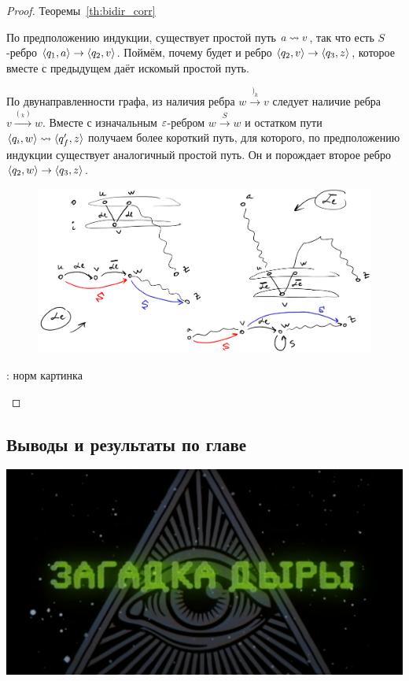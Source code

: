 \begin{proof}{Теоремы~\ref{th:bidir_corr}}
\begin{itemize}
      По предположению индукции, существует простой путь $a \rightsquigarrow v$, так что есть $S$-ребро $\langle q_1, a \rangle \rightarrow \langle q_2, v \rangle$. Поймём, почему будет и ребро $\langle q_2, v \rangle \rightarrow \langle q_3, z \rangle$, которое вместе с предыдущем даёт искомый простой путь.

      По двунаправленности графа, из наличия ребра $w \xrightarrow{)_k} v$ следует наличие ребра $v \xrightarrow{(_k)} w$. Вместе с изначальным $\varepsilon$-ребром $w \xrightarrow{S} w$ и остатком пути $\langle q_i, w \rangle \rightsquigarrow \langle q_f', z \rangle$ получаем более короткий путь, для которого, по предположению индукции существует аналогичный простой путь. Он и порождает второе ребро $\langle q_2, w \rangle \rightarrow \langle q_3, z \rangle$. 



    \begin{figure}[H]
        \includegraphics[width=\linewidth]{img/th_proof_img}
    \end{figure}

    \TODO: норм картинка
  \end{itemize}

\end{proof}

\subsection{Выводы и результаты по главе}

\includegraphics[width=0.75\linewidth]{img/hole}

\TODO